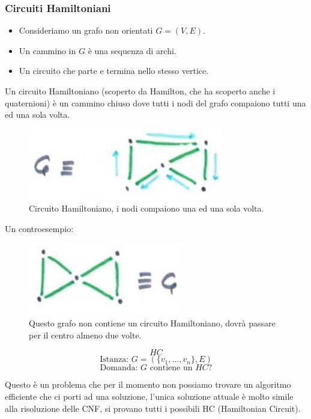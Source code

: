 \documentclass{article}
\begin{document}
\subsubsection{Circuiti Hamiltoniani}
\begin{itemize}
    \item Consideriamo un grafo non orientati $G=(V,E)$.
    \item Un cammino in $G$ è una sequenza di archi.
    \item Un circuito che parte e termina nello stesso vertice.
\end{itemize}
Un circuito Hamiltoniano (scoperto da Hamilton, che ha scoperto anche i quaternioni) è un cammino chiuso dove tutti i nodi del grafo compaiono
tutti una ed una sola volta.
\begin{figure}[H]
    \centering
    \includegraphics[scale=0.6]{images/hamiltonian_circuit.png}
    \caption{Circuito Hamiltoniano, i nodi compaiono una ed una sola volta.}
\end{figure}
Un controesempio:
\begin{figure}[H]
    \centering
    \includegraphics[scale=0.6]{images/non_hamiltonian.png}
    \caption{Questo grafo non contiene un circuito Hamiltoniano, dovrà passare per il centro
    almeno due volte.}
\end{figure}
$$HC$$
$$\text{Istanza: }G=(\{v_1,\dots,v_n\},E)$$
$$\text{Domanda: }G \text{ contiene un }HC?$$

Questo è un problema che per il momento non possiamo trovare un algoritmo efficiente
che ci porti ad una soluzione, l'unica soluzione attuale è molto simile alla risoluzione
delle CNF, si provano tutti i possibili HC (Hamiltonian Circuit).
\end{document}
